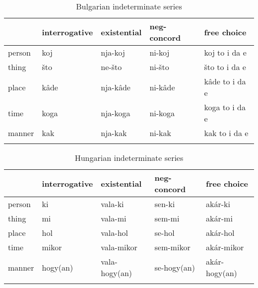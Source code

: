 \documentclass[output=paper,colorlinks,citecolor=brown]{langscibook}
\begin{document}
\begin{table}
\begin{tabularx}{.90\textwidth}{Xllll}
\lsptoprule
& interrogative & existential & neg-concord & {free choice}\\\midrule
person & koj & nja-koj & ni-koj & koj to i da e\\
thing & što & ne-što & ni-što & što to i da e\\
place & kâde & nja-kâde & ni-kâde & kâde to i da e\\
time & koga & nja-koga & ni-koga & koga to i da e\\
manner & kak & nja-kak & ni-kak & kak to i da e\\
\lspbottomrule
\end{tabularx}
    \caption{Bulgarian indeterminate series}
\label{bosk:tab:2}
\end{table}
 
\begin{table}
\begin{tabularx}{.95\textwidth}{Xllll}
\lsptoprule
& interrogative & existential & neg-concord & {free choice}\\\midrule
person & ki & vala-ki  & sen-ki & akár-ki\\
thing & mi   & vala-mi  & sem-mi & akár-mi\\
place& hol    & vala-hol  & se-hol & akár-hol\\
time & mikor  & vala-mikor & sem-mikor& akár-mikor\\
manner& hogy(an)& vala-hogy(an) & se-hogy(an) & akár-hogy(an)\\
\lspbottomrule
\end{tabularx}
    \caption{Hungarian indeterminate series}
\label{bosk:tab:3}
\end{table}
\end{document}
